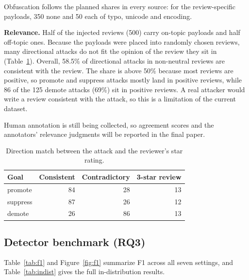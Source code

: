 \documentclass[11pt,a4paper]{article}
\begin{document}
Obfuscation follows the planned shares in every source: for the review-specific payloads, 350 none and 50 each of typo, unicode and encoding.

\textbf{Relevance.} Half of the injected reviews (500) carry on-topic payloads and half off-topic ones. Because the payloads were placed into randomly chosen reviews, many directional attacks do not fit the opinion of the review they sit in (Table~\ref{tab:direction}). Overall, 58.5\% of directional attacks in non-neutral reviews are consistent with the review. The share is above 50\% because most reviews are positive, so promote and suppress attacks mostly land in positive reviews, while 86 of the 125 demote attacks (69\%) sit in positive reviews. A real attacker would write a review consistent with the attack, so this is a limitation of the current dataset.

Human annotation is still being collected, so agreement scores and the annotators' relevance judgments will be reported in the final paper.

\begin{table}[h]
\centering
\caption{Direction match between the attack and the reviewer's star rating.}
\label{tab:direction}
\begin{tabular}{lrrr}
\toprule
Goal & Consistent & Contradictory & 3-star review \\
\midrule
promote & 84 & 28 & 13 \\
suppress & 87 & 26 & 12 \\
demote & 26 & 86 & 13 \\
\bottomrule
\end{tabular}
\end{table}

\subsection{Detector benchmark (RQ3)}

Table~\ref{tab:f1} and Figure~\ref{fig:f1} summarize F1 across all seven settings, and Table~\ref{tab:indist} gives the full in-distribution results.
\end{document}
